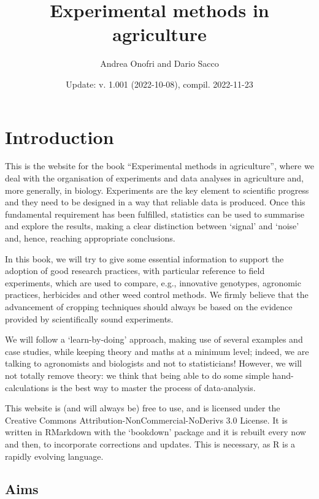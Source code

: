 \documentclass[a4paper,12pt,oneside]{book}
\author{Andrea Onofri and Dario Sacco}
\date{Update: v. 1.001 (2022-10-08), compil. 2022-11-23}
\title{Experimental methods in agriculture}
\subtitle{}
\begin{document}
\maketitle
\tableofcontents

\hypertarget{introduction}{%
\chapter*{Introduction}\label{introduction}}

This is the website for the book ``Experimental methods in agriculture'', where we deal with the organisation of experiments and data analyses in agriculture and, more generally, in biology. Experiments are the key element to scientific progress and they need to be designed in a way that reliable data is produced. Once this fundamental requirement has been fulfilled, statistics can be used to summarise and explore the results, making a clear distinction between `signal' and `noise' and, hence, reaching appropriate conclusions.

In this book, we will try to give some essential information to support the adoption of good research practices, with particular reference to field experiments, which are used to compare, e.g., innovative genotypes, agronomic practices, herbicides and other weed control methods. We firmly believe that the advancement of cropping techniques should always be based on the evidence provided by scientifically sound experiments.

We will follow a `learn-by-doing' approach, making use of several examples and case studies, while keeping theory and maths at a minimum level; indeed, we are talking to agronomists and biologists and not to statisticians! However, we will not totally remove theory: we think that being able to do some simple hand-calculations is the best way to master the process of data-analysis.

This website is (and will always be) free to use, and is licensed under the Creative Commons Attribution-NonCommercial-NoDerivs 3.0 License. It is written in RMarkdown with the `bookdown' package and it is rebuilt every now and then, to incorporate corrections and updates. This is necessary, as R is a rapidly evolving language.

\hypertarget{aims}{%
\section*{Aims}\label{aims}}
\end{document}
